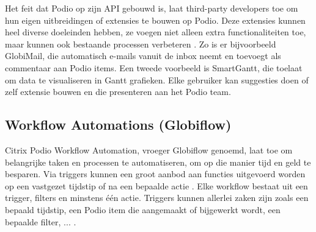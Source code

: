 Het feit dat Podio op zijn API gebouwd is, laat third-party developers toe om hun eigen uitbreidingen of extensies te bouwen op Podio. Deze extensies kunnen heel diverse doeleinden hebben, ze voegen niet alleen extra functionaliteiten toe, maar kunnen ook bestaande processen verbeteren \autocite{PodioExtensions}. Zo is er bijvoorbeeld GlobiMail, die automatisch e-mails vanuit de inbox neemt en toevoegt als commentaar aan Podio items. Een tweede voorbeeld is SmartGantt, die toelaat om data te visualiseren in Gantt grafieken. Elke gebruiker kan suggesties doen of zelf extensie bouwen en die presenteren aan het Podio team. \\


\subsection{Workflow Automations (Globiflow)}
\label{subsec:workflow_automations}

Citrix Podio Workflow Automation, vroeger Globiflow genoemd, laat toe om belangrijke taken en processen te automatiseren, om op die manier tijd en geld te besparen. Via triggers kunnen een groot aanbod aan functies uitgevoerd worden op een vastgezet tijdstip of na een bepaalde actie \autocite{PodioWorkflowAutomation}. Elke workflow bestaat uit een trigger, filters en minstens één actie. Triggers kunnen allerlei zaken zijn zoals een bepaald tijdstip, een Podio item die aangemaakt of bijgewerkt wordt, een bepaalde filter, ... \autocite{PodioWorkflowFeatures}. \\

